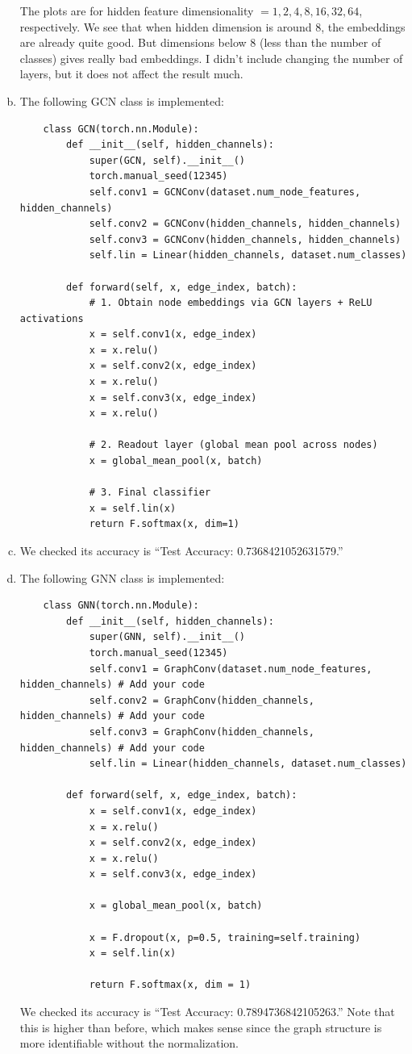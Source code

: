 \documentclass[11pt]{scrartcl}
\begin{document}
\begin{enumerate}[(a)]
\begin{center}
    \end{center}
    The plots are for hidden feature dimensionality $=1, 2, 4, 8, 16, 32, 64$, respectively. We see that when hidden dimension is around 8, the embeddings are already quite good. But dimensions below 8 (less than the number of classes) gives really bad embeddings. I didn't include changing the number of layers, but it does not affect the result much.
    \item The following GCN class is implemented: \begin{verbatim}
    class GCN(torch.nn.Module):
        def __init__(self, hidden_channels):
            super(GCN, self).__init__()
            torch.manual_seed(12345)
            self.conv1 = GCNConv(dataset.num_node_features, hidden_channels)
            self.conv2 = GCNConv(hidden_channels, hidden_channels)
            self.conv3 = GCNConv(hidden_channels, hidden_channels)
            self.lin = Linear(hidden_channels, dataset.num_classes)
        
        def forward(self, x, edge_index, batch):
            # 1. Obtain node embeddings via GCN layers + ReLU activations
            x = self.conv1(x, edge_index)
            x = x.relu()
            x = self.conv2(x, edge_index)
            x = x.relu()
            x = self.conv3(x, edge_index)
            x = x.relu()

            # 2. Readout layer (global mean pool across nodes)
            x = global_mean_pool(x, batch)

            # 3. Final classifier
            x = self.lin(x)
            return F.softmax(x, dim=1)
    \end{verbatim}
    \item We checked its accuracy is ``Test Accuracy: 0.7368421052631579.''
    \item The following GNN class is implemented: \begin{verbatim}
    class GNN(torch.nn.Module):
        def __init__(self, hidden_channels):
            super(GNN, self).__init__()
            torch.manual_seed(12345)
            self.conv1 = GraphConv(dataset.num_node_features, hidden_channels) # Add your code
            self.conv2 = GraphConv(hidden_channels, hidden_channels) # Add your code
            self.conv3 = GraphConv(hidden_channels, hidden_channels) # Add your code
            self.lin = Linear(hidden_channels, dataset.num_classes)

        def forward(self, x, edge_index, batch):
            x = self.conv1(x, edge_index)
            x = x.relu()
            x = self.conv2(x, edge_index)
            x = x.relu()
            x = self.conv3(x, edge_index)

            x = global_mean_pool(x, batch)

            x = F.dropout(x, p=0.5, training=self.training)
            x = self.lin(x)
            
            return F.softmax(x, dim = 1)
    \end{verbatim}
    We checked its accuracy is ``Test Accuracy: 0.7894736842105263.'' Note that this is higher than before, which makes sense since the graph structure is more identifiable without the normalization.
\end{enumerate}
\end{document}
